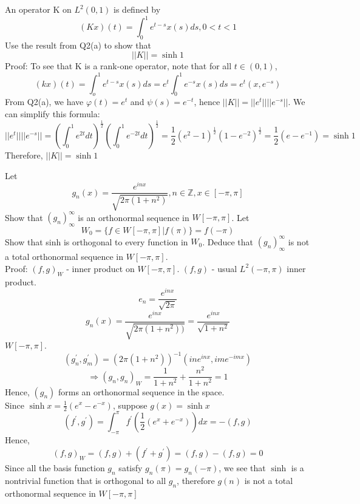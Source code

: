 \documentclass [12pt,letterpaper]{exam}
\begin{document}
\begin{questions}
\question An operator K on $L^{2}(0,1)$ is defined by $$(Kx)(t) = \int_{0}^{1} e^{t-s} x(s)ds,   0<t<1$$
Use the result from Q2(a) to show that $$||K|| = \sinh1$$
Proof: To see that K is a rank-one operator, note that for all $t \in (0,1)$,
$$(kx)(t) = \int_{o}^{1} e^{t-s} x(s)ds = e^t \int_{0}^{1} e^{-s} x(s)ds = e^{t}(x,e^{-s})$$
From Q2(a), we have $\varphi(t) = e^t$ and $\psi(s) = e^{-t}$, hence $||K|| = ||e^{t}||||e^{-s}||$. We can simplify this formula:
$$||e^{t}||||e^{-s}|| = (\int_{0}^{1} e^{2t}dt)^{\frac{1}{2}}(\int_{0}^{1} e^{-2t}dt)^{\frac{1}{2}} = \frac{1}{2}(e^2 - 1)^{\frac{1}{2}}(1 - e^{-2})^\frac{1}{2} = \frac{1}{2}(e - e^{-1}) = \sinh1$$
Therefore, $||K|| = \sinh1$


\question Let $$g_n(x) = \frac{e^{inx}}{\sqrt{2 \pi (1+n^2)}}, n\in \mathbb{Z}, x \in [-\pi, \pi]$$
Show that $(g_n)_{\infty}^{\infty}$ is an orthonormal sequence in $W[-\pi, \pi]$. Let $$W_0 = \big\{ f \in W[-\pi,\pi] | f(\pi) \big\}= f(-\pi)$$
Show that sinh is orthogonal to every function in $W_0$. Deduce that $(g_n)_{\infty}^{\infty}$ is not a total orthonormal sequence in $W[-\pi,\pi]$.\\

Proof: $(f,g)_W$ - inner product on $W[-\pi,\pi]$. $(f,g)$ - usual $L^2 (-\pi,\pi)$ inner product.\\
$$e_n = \frac{e^{inx}}{\sqrt{2\pi}}$$
$$g_n(x) = \frac{e^{inx}}{\sqrt{2\pi(1+n^2))}} = \frac{e^{inx}}{\sqrt{1+n^2}}$$
 $W[-\pi,\pi]$. $$(g_{n}^{'},g_{m}^{'}) = (2\pi(1+n^2))^{-1}({in}e^{inx},ime^{-imx})$$
$$\Rightarrow (g_n,g_n)_W = \frac{1}{1+n^2} +\frac{n^2}{1+n^2} = 1$$
Hence, $(g_n)$ forms an orthonormal sequence in the space.\\
Since $\sinh x = \frac{1}{2}(e^x - e^{-x})$, suppose $g(x) = \sinh x$\\
$$(f^{'},g^{'}) = \int_{-\pi}^{\pi} f^{'}(\frac{1}{2}(e^x + e^{-x})) dx = -(f,g)$$
Hence, $$(f,g)_W = (f,g) + (f^{'} + g^{'}) = (f,g) - (f,g) = 0$$
Since all the basis function $g_n$ satisfy $g_n(\pi) = g_n(-\pi)$, we see that $\sinh$ is a nontrivial function that is orthogonal to all $g_n$, therefore $g(n)$ is not a total orthonormal sequence in $W[-\pi,\pi]$




\end{questions}
\end{document}

